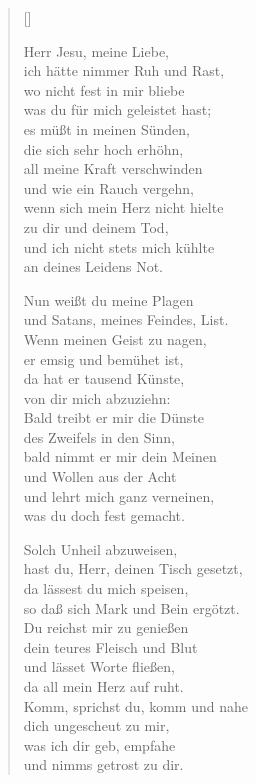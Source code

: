 \begin{multicols}{2}
\settowidth{\versewidth}{Nun weißt du meine Plagen}
\begin{verse}[\versewidth]


 Herr Jesu, meine Liebe,\\
ich hätte nimmer Ruh und Rast,\\
wo nicht fest in mir bliebe\\
was du für mich geleistet hast;\\
es müßt in meinen Sünden,\\
die sich sehr hoch erhöhn,\\
all meine Kraft verschwinden\\
und wie ein Rauch vergehn,\\
wenn sich mein Herz nicht hielte\\
zu dir und deinem Tod,\\
und ich nicht stets mich kühlte\\
an deines Leidens Not.

 Nun weißt du meine Plagen\\
und Satans, meines Feindes, List.\\
Wenn meinen Geist zu nagen,\\
er emsig und bemühet ist,\\
da hat er tausend Künste,\\
von dir mich abzuziehn:\\
Bald treibt er mir die Dünste\\
des Zweifels in den Sinn,\\
bald nimmt er mir dein Meinen\\
und Wollen aus der Acht\\
und lehrt mich ganz verneinen,\\
was du doch fest gemacht.

 Solch Unheil abzuweisen,\\
hast du, Herr, deinen Tisch gesetzt,\\
da lässest du mich speisen,\\
so daß sich Mark und Bein ergötzt.\\
Du reichst mir zu genießen\\
dein teures Fleisch und Blut\\
und lässet Worte fließen,\\
da all mein Herz auf ruht.\\
Komm, sprichst du, komm und nahe\\
dich ungescheut zu mir,\\
was ich dir geb, empfahe\\
und nimms getrost zu dir.


\end{verse}
\end{multicols}
